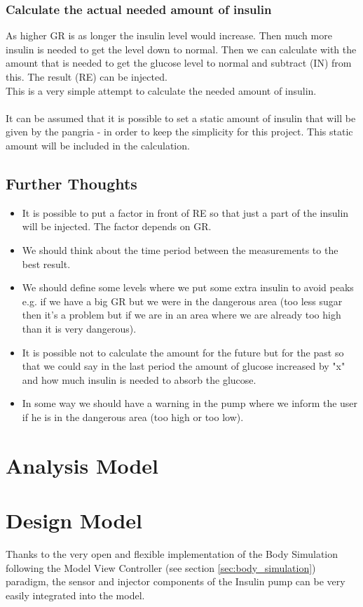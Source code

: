 \documentclass[pdflatex,a4paper,11pt,english]{scrreprt}
\begin{document}
\subsubsection{Calculate the actual needed amount of insulin}
As higher GR is as longer the insulin level would increase. Then much more
insulin is needed to get the level down to normal. Then we can calculate with
the amount that is needed to get the glucose level to normal and subtract (IN)
from this. The result (RE) can be injected. \\
This is a very simple attempt to calculate the needed amount of insulin. \\ \\
It can be assumed that it is possible to set a static amount of insulin
that will be given by the pangria - in order to keep the simplicity for this project. This static amount will be included in the calculation.

\subsection{Further Thoughts}
\begin{itemize}
  \item It is possible to put a factor in front of RE so that just a part of
  the insulin will be injected. The factor depends on GR.
  \item We should think about the time period between the measurements to the
  best result.
  \item We should define some levels where we put some extra insulin to avoid
  peaks e.g. if we have a big GR but we were in the dangerous area (too less
  sugar then it's a problem but if we are in an area where we are already too
  high than it is very dangerous).
  \item It is possible not to calculate the amount for the future but for the
  past so that we could say in the last period the amount of glucose increased by
  "x" and how much insulin is needed to absorb the glucose.
  \item In some way we should have a warning in the pump where we inform the
  user if he is in the dangerous area (too high or too low).
\end{itemize}

\section{Analysis Model}

\section{Design Model}
Thanks to the very open and flexible implementation of the Body Simulation
following the Model View Controller (see section \vref{sec:body_simulation})
paradigm, the sensor and injector components of the Insulin pump can be very
easily integrated into the model.
\end{document}
